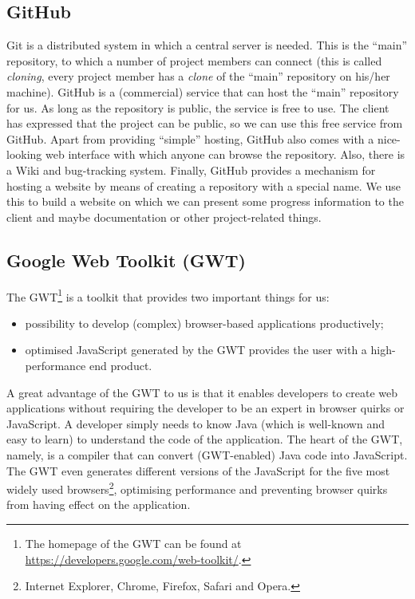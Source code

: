 \subsection{GitHub}
\label{subsec:tools-github}
Git is a distributed system in which a central server is needed. This is the ``main'' repository, to which a number of project members can connect (this is called \emph{cloning}, every project member has a \emph{clone} of the ``main'' repository on his/her machine). GitHub is a (commercial) service that can host the ``main'' repository for us. As long as the repository is public, the service is free to use. The client has expressed that the project can be public, so we can use this free service from GitHub. Apart from providing ``simple'' hosting, GitHub also comes with a nice-looking web interface with which anyone can browse the repository. Also, there is a Wiki and bug-tracking system. Finally, GitHub provides a mechanism for hosting a website by means of creating a repository with a special name. We use this to build a website on which we can present some progress information to the client and maybe documentation or other project-related things.

\subsection{Google Web Toolkit (GWT)}
\label{subsec:tools-gwt}
The GWT\footnote{The homepage of the GWT can be found at \url{https://developers.google.com/web-toolkit/}.} is a toolkit that provides two important things for us:
\begin{itemize}
	\item possibility to develop (complex) browser-based applications productively;
	\item optimised JavaScript generated by the GWT provides the user with a high-performance end product.
\end{itemize}
A great advantage of the GWT to us is that it enables developers to create web applications without requiring the developer to be an expert in browser quirks or JavaScript. A developer simply needs to know Java (which is well-known and easy to learn) to understand the code of the application. The heart of the GWT, namely, is a compiler that can convert (GWT-enabled) Java code into JavaScript. The GWT even generates different versions of the JavaScript for the five most widely used browsers\footnote{Internet Explorer, Chrome, Firefox, Safari and Opera.}, optimising performance and preventing browser quirks from having effect on the application.

